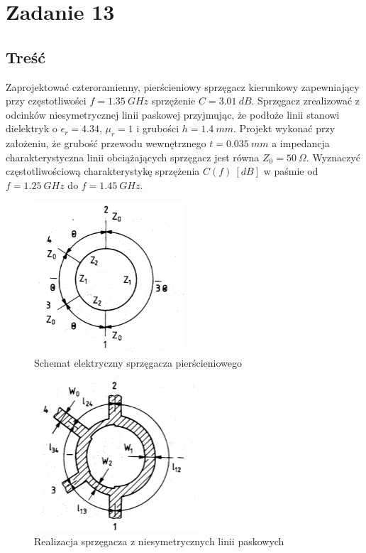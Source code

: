 \documentclass[rep.tex]{subfiles}
\begin{document}
\chapter{Zadanie 13}
\label{zad13}
\section{Treść}
Zaprojektować czteroramienny, pierścieniowy sprzęgacz kierunkowy zapewniający przy
częstotliwości $f = 1.35~GHz$ sprzężenie $C = 3.01~dB$.
Sprzęgacz zrealizować z odcinków niesymetrycznej linii paskowej przyjmując,
że podłoże linii stanowi dielektryk o $\epsilon_r = 4.34$, $\mu_r = 1$ i grubości $h = 1.4~mm$.
Projekt wykonać przy założeniu, że grubość przewodu wewnętrznego $t = 0.035~mm$ a impedancja charakterystyczna linii obciążających sprzęgacz jest równa $Z_0 = 50~\Omega$.
Wyznaczyć częstotliwościową charakterystykę sprzężenia $C(f)~[dB]$ w paśmie od $f = 1.25~GHz$ do $f = 1.45~GHz$.

\begin{figure}[!htbp]
  \centering
  \includegraphics[width=0.5\linewidth]{fig/zad13/coupler_1}
  \caption{Schemat elektryczny sprzęgacza pierścieniowego}
  \label{fig:zad13:coupler1}
\end{figure}

\begin{figure}[!htbp]
  \centering
  \includegraphics[width=0.5\linewidth]{fig/zad13/coupler_2}
  \caption{Realizacja sprzęgacza z niesymetrycznych linii paskowych}
  \label{fig:zad13:coupler2}
\end{figure}
\end{document}
